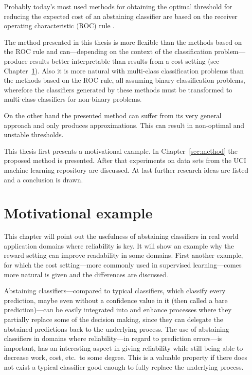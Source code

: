 \documentclass[twoside,11pt]{article}
\begin{document}
Probably today's most used methods for obtaining the
optimal threshold for reducing the expected cost of an
abstaining classifier are based on the receiver operating
characteristic (ROC) rule
\citep[see][]{tortella_2000,pietraszek_2005,
  vanderlooy_et_al_2009, guan_et_al_2018}.

The method presented in this thesis is more flexible than
the methods based on the ROC rule and can---depending on
the context of the classification problem---produce results
better interpretable than results from a cost setting
(see Chapter~\ref{sec:example}).
Also it is more natural with multi-class classification
problems than the methods based on the ROC rule, all
assuming binary classification problems, wherefore the
classifiers generated by these methods must be transformed
to multi-class classifiers for non-binary problems.

On the other hand the presented method can suffer from its
very general approach and only produces approximations.
This can result in non-optimal and unstable thresholds.

This thesis first presents a motivational example.
In Chapter~\ref{sec:method} the proposed method is
presented.
After that experiments on data sets from the UCI machine
learning repository \citep[see][]{uci} are discussed.
At last further research ideas are listed and a conclusion
is drawn.

\section{Motivational example}
\label{sec:example}

This chapter will point out the usefulness of abstaining
classifiers in real world application domains where
reliability is key.
It will show an example why the reward setting can improve
readability in some domains.
First another example, for which the cost setting---more
commonly used in supervised learning---comes more natural
is given and the differences are discussed.

Abstaining classifiers---compared to typical classifiers,
which classify every prediction, maybe even without a
confidence value in it (then called a bare
prediction)---can be easily integrated into and enhance
processes where they partially replace some of the decision
making, since they can delegate the abstained predictions
back to the underlying process.
The use of abstaining classifiers in domains where
reliability---in regard to prediction errors---is
important, has an interesting aspect in giving
reliability while still being able to decrease work, cost,
etc.\ to some degree.
This is a valuable property if there does not exist a
typical classifier good enough to fully replace the
underlying process.
\end{document}
